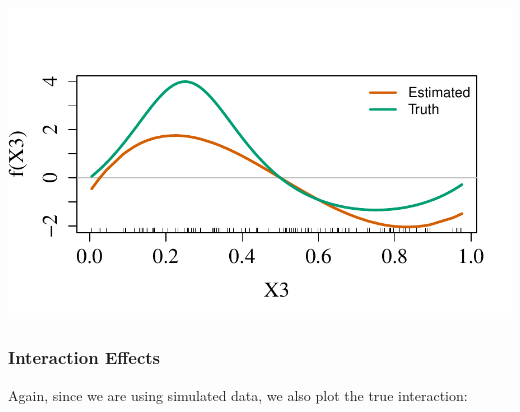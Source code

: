 \begin{knitrout}\scriptsize
	\color{fgcolor}\begin{kframe}
		\begin{alltt}
			\hlopt{$}  \hlopt{$}  \hlstd{=} \hlstd{,}
			 \hlstd{=} \hlstd{,}
			 \hlopt{$}  \hlopt{$}
		\end{alltt}
	\end{kframe}
	
	{\centering \includegraphics[width=1\linewidth]{figs/sail-main-eff-1} 
		
	}
	
	
	
\end{knitrout}


\subsubsection{Interaction Effects}

Again, since we are using simulated data, we also plot the true interaction:

